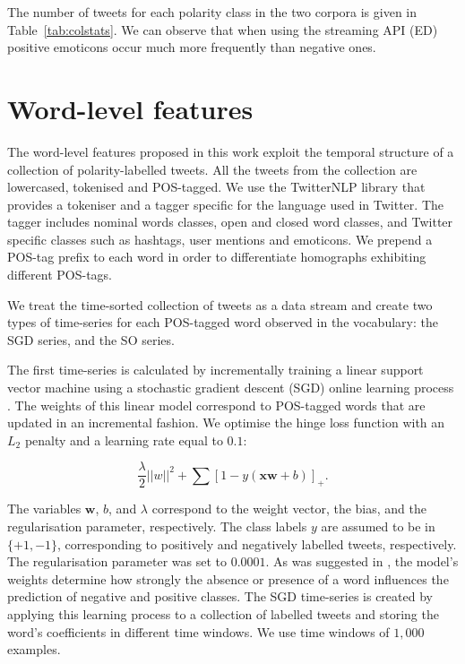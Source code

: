 \documentclass{sig-alternate}
\begin{document}
The number of tweets for each polarity class in the two corpora is given in Table~\ref{tab:colstats}. We can observe that when using the streaming API (ED) positive emoticons occur much more frequently than negative ones.


\section{Word-level features}\label{sec:feat}

The word-level features proposed in this work exploit the temporal structure of a collection of polarity-labelled tweets. All the tweets from the collection are lowercased, tokenised and POS-tagged. We use the TwitterNLP library \cite{twitterNLP} that provides a  tokeniser and a tagger specific for the language used in Twitter. The tagger includes  nominal words classes, open and closed word classes, and Twitter specific classes such as hashtags, user mentions and emoticons. We prepend a POS-tag prefix to each word in order to differentiate homographs exhibiting different POS-tags.

We  treat the time-sorted collection of tweets as a data stream and create two types of time-series for each POS-tagged word observed in the vocabulary: the SGD series, and the SO series.

The first time-series is calculated by incrementally training a linear support vector machine using a stochastic gradient descent (SGD) online learning process \cite{Zhang2004}. The weights of this linear model correspond to POS-tagged words that are updated in an incremental fashion. We  optimise the hinge loss function with an $L_2$ penalty and a learning rate equal to $0.1$:
 
\begin{equation}\label{eq:sgd}
\frac{\lambda}{2}||w||^2+\sum [1- y (\mathbf{xw} +b) ]_{+}.
\end{equation}

The variables $\mathbf{w}$, $b$, and $\lambda$ correspond to the weight vector, the bias, and the regularisation parameter, respectively. The class labels $y$ are assumed to be in $\{+1,-1\}$, corresponding to positively and negatively labelled tweets, respectively. The regularisation parameter was set to $0.0001$.  As was suggested in \cite{bifet2010}, the model's weights determine how strongly the absence or presence of a word influences the prediction of negative and positive classes.  The SGD time-series is created by applying this learning process to a collection of labelled tweets and storing the word's coefficients in different time windows. We use time windows of $1,000$ examples.  
\end{document}
